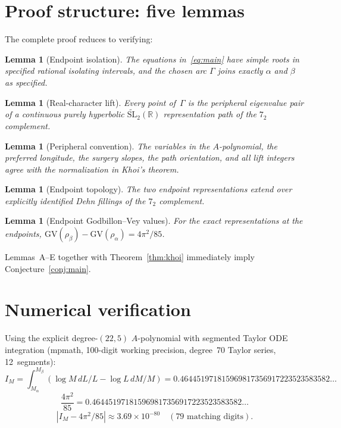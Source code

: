 \documentclass[11pt]{article}
\newtheorem{lemma}[theorem]{Lemma}
\theoremstyle{remark}
\begin{document}
\section{Proof structure: five lemmas}

The complete proof reduces to verifying:

\begin{lemma}[Endpoint isolation]\label{lem:A}
The equations in~\eqref{eq:main} have simple roots in specified
rational isolating intervals, and the chosen arc $\Gamma$ joins
exactly $\alpha$ and $\beta$ as specified.
\end{lemma}

\begin{lemma}[Real-character lift]\label{lem:B}
Every point of~$\Gamma$ is the peripheral eigenvalue pair of a
continuous purely hyperbolic
$\widetilde{\mathrm{SL}}_2(\mathbb{R})$
representation path of the $7_2$ complement.
\end{lemma}

\begin{lemma}[Peripheral convention]\label{lem:C}
The variables in the $A$-polynomial, the preferred longitude,
the surgery slopes, the path orientation, and all lift integers
agree with the normalization in Khoi's theorem.
\end{lemma}

\begin{lemma}[Endpoint topology]\label{lem:D}
The two endpoint representations extend over explicitly identified
Dehn fillings of the $7_2$ complement.
\end{lemma}

\begin{lemma}[Endpoint Godbillon--Vey values]\label{lem:E}
For the exact representations at the endpoints,
$\mathrm{GV}(\rho_\beta) - \mathrm{GV}(\rho_\alpha)
= 4\pi^2/85$.
\end{lemma}

Lemmas~A--E together with Theorem~\ref{thm:khoi} immediately
imply Conjecture~\ref{conj:main}.

\section{Numerical verification}

Using the explicit degree-$(22,5)$ $A$-polynomial with
segmented Taylor ODE integration (mpmath, 100-digit
working precision, degree~70 Taylor series, 12~segments):
\[
I_M = \int_{M_\alpha}^{M_\beta}
(\log M\,dL/L - \log L\,dM/M)
= 0.464451971815969817356917223523583582\ldots
\]
\[
\frac{4\pi^2}{85} =
0.464451971815969817356917223523583582\ldots
\]
\[
|I_M - 4\pi^2/85| \approx 3.69 \times 10^{-80}
\quad (\text{79 matching digits}).
\]
\end{document}
